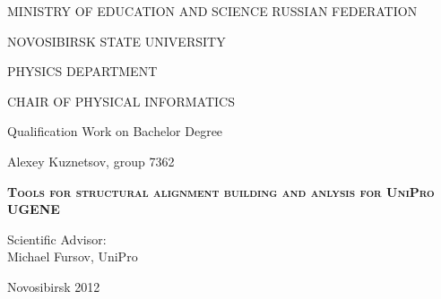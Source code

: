 \begin{titlepage}
\newpage

\thispagestyle{empty}
\begin{center}
\begin{large}
MINISTRY OF EDUCATION AND SCIENCE
RUSSIAN FEDERATION

\vspace{0.3cm}

NOVOSIBIRSK STATE UNIVERSITY

\vspace{1.6cm}

PHYSICS DEPARTMENT

\vspace {0.5cm}

CHAIR OF PHYSICAL INFORMATICS

\vspace {4cm}

Qualification Work on Bachelor Degree

\vspace {1cm}

Alexey Kuznetsov, group 7362

\vspace {1.5cm}

\textsc{\textbf{Tools for structural alignment building and anlysis for UniPro UGENE}}

\vspace {1.5cm}

\begin{flushright}
    Scientific Advisor:\\
    Michael Fursov, UniPro
\end{flushright}

\vspace {5cm}

Novosibirsk 2012
\end{large}
\end{center}

\end{titlepage}

